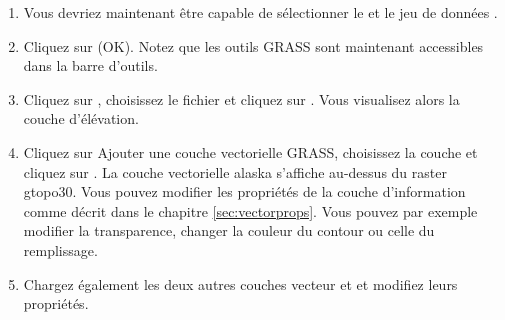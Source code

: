 \begin{enumerate}
  \item Vous devriez maintenant \^etre capable de s\'electionner le  et le jeu de donn\'ees . 
  \item Cliquez sur \button(OK). Notez que les outils GRASS sont maintenant accessibles dans la barre d'outils.
  \item Cliquez sur , choisissez le fichier  et cliquez sur . Vous visualisez alors la couche d'\'el\'evation.
  \item Cliquez sur  {Ajouter une couche vectorielle GRASS}, choisissez la couche  et cliquez sur . La couche vectorielle alaska s'affiche au-dessus du raster gtopo30. Vous pouvez modifier les propri\'et\'es de la couche d'information comme d\'ecrit dans le chapitre \ref{sec:vectorprops}. Vous pouvez par exemple modifier la transparence, changer la couleur du contour ou celle du remplissage.
  \item Chargez \'egalement les deux autres couches vecteur  et  et modifiez leurs propri\'et\'es.
\end{enumerate}


